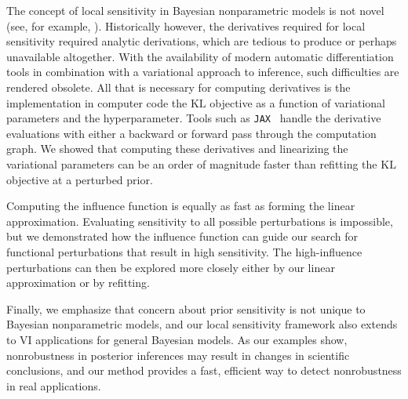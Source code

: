The concept of local sensitivity in Bayesian nonparametric models is not novel
(see, for example, \cite{basu:1996:local}).
Historically however, the derivatives required for local sensitivity
required analytic derivations, which are tedious to produce
or perhaps unavailable altogether.
With the availability of modern automatic differentiation tools in combination
with a variational approach to inference,
such difficulties are rendered obsolete.
All that is necessary for computing derivatives
is the implementation in computer code the
$\mathrm{KL}$ objective as a function of variational parameters
and the hyperparameter. Tools such as \texttt{JAX}~\citep{jax2018github}
handle the derivative evaluations with either a backward or forward pass
through the computation graph.
We showed that computing these derivatives and linearizing the variational parameters
can be an order of magnitude faster than refitting the $\mathrm{KL}$ objective at
a perturbed prior.

Computing the influence function is equally as fast as forming
the linear approximation.
Evaluating sensitivity to all possible perturbations is impossible, but
we demonstrated how the influence function can guide our search for
functional perturbations that result in high sensitivity.
The high-influence perturbations can then be explored more closely either by our linear approximation
or by refitting.

Finally, we emphasize that concern about prior sensitivity is not
unique to Bayesian nonparametric models, and our local sensitivity framework
also extends to VI applications for general Bayesian models.
As our examples show, nonrobustness in posterior inferences
may result in changes in scientific conclusions,
and our method provides a fast, efficient way to detect nonrobustness in
real applications.
